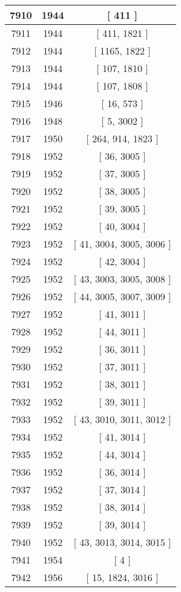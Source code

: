 \begin{center}
\begin{longtable}[H]{|| c c c ||}
7910 & 1944 & [ 411 ] \\ 
\hline
7911 & 1944 & [ 411, 1821 ] \\ 
\hline
7912 & 1944 & [ 1165, 1822 ] \\ 
\hline
7913 & 1944 & [ 107, 1810 ] \\ 
\hline
7914 & 1944 & [ 107, 1808 ] \\ 
\hline
7915 & 1946 & [ 16, 573 ] \\ 
\hline
7916 & 1948 & [ 5, 3002 ] \\ 
\hline
7917 & 1950 & [ 264, 914, 1823 ] \\ 
\hline
7918 & 1952 & [ 36, 3005 ] \\ 
\hline
7919 & 1952 & [ 37, 3005 ] \\ 
\hline
7920 & 1952 & [ 38, 3005 ] \\ 
\hline
7921 & 1952 & [ 39, 3005 ] \\ 
\hline
7922 & 1952 & [ 40, 3004 ] \\ 
\hline
7923 & 1952 & [ 41, 3004, 3005, 3006 ] \\ 
\hline
7924 & 1952 & [ 42, 3004 ] \\ 
\hline
7925 & 1952 & [ 43, 3003, 3005, 3008 ] \\ 
\hline
7926 & 1952 & [ 44, 3005, 3007, 3009 ] \\ 
\hline
7927 & 1952 & [ 41, 3011 ] \\ 
\hline
7928 & 1952 & [ 44, 3011 ] \\ 
\hline
7929 & 1952 & [ 36, 3011 ] \\ 
\hline
7930 & 1952 & [ 37, 3011 ] \\ 
\hline
7931 & 1952 & [ 38, 3011 ] \\ 
\hline
7932 & 1952 & [ 39, 3011 ] \\ 
\hline
7933 & 1952 & [ 43, 3010, 3011, 3012 ] \\ 
\hline
7934 & 1952 & [ 41, 3014 ] \\ 
\hline
7935 & 1952 & [ 44, 3014 ] \\ 
\hline
7936 & 1952 & [ 36, 3014 ] \\ 
\hline
7937 & 1952 & [ 37, 3014 ] \\ 
\hline
7938 & 1952 & [ 38, 3014 ] \\ 
\hline
7939 & 1952 & [ 39, 3014 ] \\ 
\hline
7940 & 1952 & [ 43, 3013, 3014, 3015 ] \\ 
\hline
7941 & 1954 & [ 4 ] \\ 
\hline
7942 & 1956 & [ 15, 1824, 3016 ] \\ 

\end{longtable}
\end{center}
